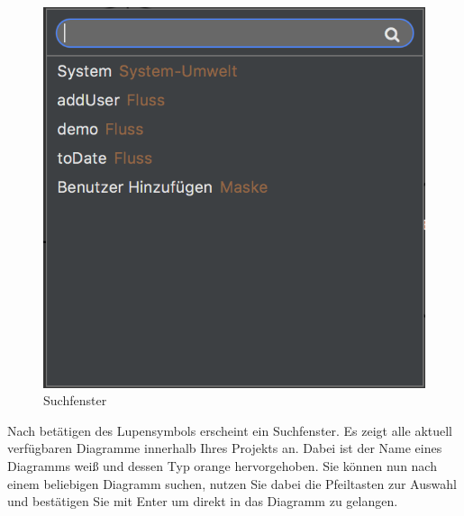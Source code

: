 \begin{figure}[H]
	\centering
	\includegraphics[width=.45\textwidth]{Search.png}
	\caption{Suchfenster}
\end{figure}
Nach betätigen des Lupensymbols erscheint ein Suchfenster. Es zeigt alle aktuell verfügbaren Diagramme innerhalb Ihres Projekts an. Dabei ist der Name eines Diagramms weiß und dessen Typ orange hervorgehoben. Sie können nun nach einem beliebigen Diagramm suchen, nutzen Sie dabei die Pfeiltasten zur Auswahl und bestätigen Sie mit Enter um direkt in das Diagramm zu gelangen.
